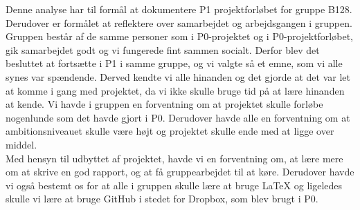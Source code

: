 Denne analyse har til formål at dokumentere P1 projektforløbet for gruppe B128. Derudover er formålet at reflektere over samarbejdet og arbejdsgangen i gruppen.
\\
Gruppen består af de samme personer som i P0-projektet og i P0-projektforløbet, gik samarbejdet godt og vi fungerede fint sammen socialt. Derfor blev det besluttet at fortsætte i P1 i samme gruppe, og vi valgte så et emne, som vi alle synes var spændende. Derved kendte vi alle hinanden og det gjorde at det var let at komme i gang med projektet, da vi ikke skulle bruge tid på at lære hinanden at kende. Vi havde i gruppen en forventning om at projektet skulle forløbe nogenlunde som det havde gjort i P0. Derudover havde alle en forventning om at ambitionsniveauet skulle være højt og projektet skulle ende med at ligge over middel. 
\\
Med hensyn til udbyttet af projektet, havde vi en forventning om, at lære mere om at skrive en god rapport, og at få gruppearbejdet til at køre. Derudover havde vi også bestemt os for at alle i gruppen skulle lære at bruge \LaTeX{} og ligeledes skulle vi lære at bruge GitHub i stedet for Dropbox, som blev brugt i P0.  
